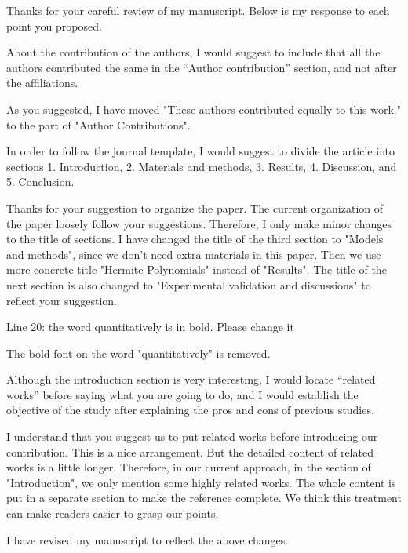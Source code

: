\documentclass[answers]{exam}
\begin{document}
\pagestyle{empty}
Thanks for your careful review of my manuscript. Below is my response to each point you proposed.

\begin{questions}
\question
About the contribution of the authors, I would suggest to include that all the authors contributed the same in the “Author contribution” section, and not after the affiliations.
\begin{solution}
    As you suggested, I have moved "These authors contributed equally to this work." to the part of "Author Contributions".
\end{solution}

\question In order to follow the journal template, I would suggest to divide the article into sections 1. Introduction, 2. Materials and methods, 3. Results, 4. Discussion, and 5. Conclusion.
\begin{solution}
    Thanks for your suggestion to organize the paper. The current organization
    of the paper loosely follow your suggestions. Therefore, I only make minor changes to the title of sections.
    I have changed the title of the third section to "Models and methods", since we don't need extra materials in this paper.
    Then we use more concrete title "Hermite Polynomials" instead of "Results".
    The title of the next section is also changed to "Experimental validation and discussions" to reflect your suggestion.
\end{solution}
\question Line 20: the word quantitatively is in bold. Please change it
\begin{solution}
    The bold font on the word "quantitatively" is removed.
\end{solution}
\question 
Although the introduction section is very interesting, I would locate “related works” before saying what you are going to do, and I would establish the objective of the study after explaining the pros and cons of previous studies.
\begin{solution}
    I understand that you suggest us
    to put related works before introducing
    our contribution. This is a nice arrangement.
    But the detailed content of related works
    is a little longer. Therefore, in our current approach,
    in the section of "Introduction",
    we only mention some highly related works.
    The whole content is put in a separate section to make the
    reference complete. We think this treatment can make readers easier to grasp our points.
\end{solution}
\end{questions}
I have revised my manuscript to reflect the above changes.
\end{document}
